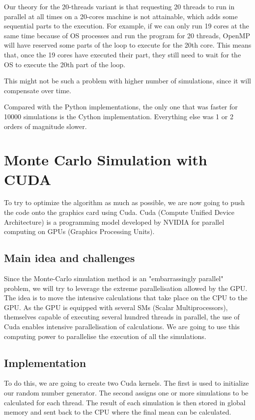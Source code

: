 \documentclass[12pt,a4paper]{report}
\begin{document}
Our theory for the 20-threads variant is that requesting 20 threads to run in parallel at all times on a 20-cores machine is not attainable, which adds some sequential parts to the execution. For example, if we can only run 19 cores at the same time because of OS processes and run the program for 20 threads, OpenMP will have reserved some parts of the loop to execute for the 20th core. This means that, once the 19 cores have executed their part, they still need to wait for the OS to execute the 20th part of the loop.

This might not be such a problem with higher number of simulations, since it will compensate over time.

Compared with the Python implementations, the only one that was faster for 10000 simulations is the Cython implementation. Everything else was 1 or 2 orders of magnitude slower.

\section{Monte Carlo Simulation with CUDA}

To try to optimize the algorithm as much as possible, we are now going to push the code onto the graphics card using Cuda. Cuda (Compute Unified Device Architecture) is a programming model developed by NVIDIA for parallel computing on GPUs (Graphics Processing Units). 

\subsection{Main idea and challenges}

Since the Monte-Carlo simulation method is an "embarrassingly parallel" problem, we will try to leverage the extreme parallelisation allowed by the GPU. The idea is to move the intensive calculations that take place on the CPU to the GPU. As the GPU is equipped with several SMs (Scalar Multiprocessors), themselves capable of executing several hundred threads in parallel, the use of Cuda enables intensive parallelisation of calculations. We are going to use this computing power to parallelise the execution of all the simulations. 

\subsection{Implementation}

To do this, we are going to create two Cuda kernels. The first is used to initialize our random number generator. The second assigns one or more simulations to be calculated for each thread. The result of each simulation is then stored in global memory and sent back to the CPU where the final mean can be calculated. 
\end{document}
